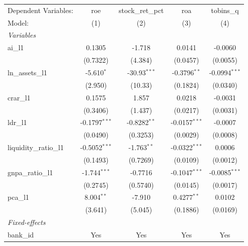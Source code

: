 
\begingroup
\centering
\begin{tabular}{lcccc}
   \tabularnewline \midrule \midrule
   Dependent Variables:   & roe             & stock\_ret\_pct   & roa             & tobins\_q\\   
   Model:                 & (1)             & (2)               & (3)             & (4)\\  
   \midrule
   \emph{Variables}\\
   ai\_l1                 & 0.1305          & -1.718            & 0.0141          & -0.0060\\   
                          & (0.7322)        & (4.384)           & (0.0457)        & (0.0055)\\   
   ln\_assets\_l1         & -5.610$^{*}$    & -30.93$^{***}$    & -0.3796$^{**}$  & -0.0994$^{***}$\\   
                          & (2.950)         & (10.33)           & (0.1824)        & (0.0340)\\   
   crar\_l1               & 0.1575          & 1.857             & 0.0218          & -0.0031\\   
                          & (0.3406)        & (1.437)           & (0.0217)        & (0.0031)\\   
   ldr\_l1                & -0.1797$^{***}$ & -0.8282$^{**}$    & -0.0157$^{***}$ & -0.0007\\   
                          & (0.0490)        & (0.3253)          & (0.0029)        & (0.0008)\\   
   liquidity\_ratio\_l1   & -0.5052$^{***}$ & -1.763$^{**}$     & -0.0322$^{***}$ & 0.0006\\   
                          & (0.1493)        & (0.7269)          & (0.0109)        & (0.0012)\\   
   gnpa\_ratio\_l1        & -1.744$^{***}$  & -0.7716           & -0.1047$^{***}$ & -0.0085$^{***}$\\   
                          & (0.2745)        & (0.5740)          & (0.0145)        & (0.0017)\\   
   pca\_l1                & 8.004$^{**}$    & -7.910            & 0.4277$^{**}$   & 0.0102\\   
                          & (3.641)         & (5.045)           & (0.1886)        & (0.0169)\\   
   \midrule
   \emph{Fixed-effects}\\
   bank\_id               & Yes             & Yes               & Yes             & Yes\\  

\end{tabular}
